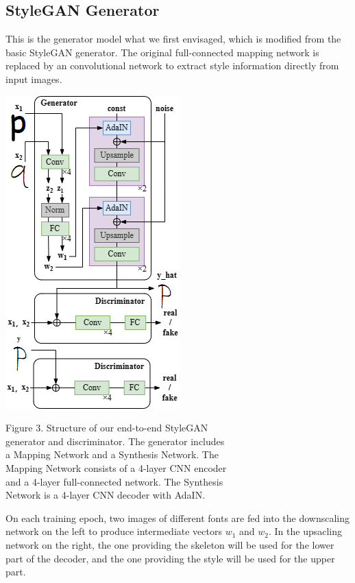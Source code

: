\documentclass[letterpaper]{article}
\begin{document}
\subsection{StyleGAN Generator}
This is the generator model what we first envisaged, which is modified from the basic StyleGAN generator. The original full-connected mapping network is replaced by an convolutional network to extract style information directly from input images.

\begin{center}
    \includegraphics[]{report-fig-model-1.png}

    Figure 3. Structure of our end-to-end StyleGAN\\generator and discriminator. The generator includes\\a Mapping Network and a Synthesis Network. The\\Mapping Network consists of a 4-layer CNN encoder\\and a 4-layer full-connected network. The Synthesis\\Network is a 4-layer CNN decoder with AdaIN.
\end{center}
On each training epoch, two images of different fonts are fed into the downscaling network on the left to produce intermediate vectors $w_1$ and $w_2$. In the upsacling network on the right, the one providing the skeleton will be used for the lower part of the decoder, and the one providing the style will be used for the upper part.
\end{document}
